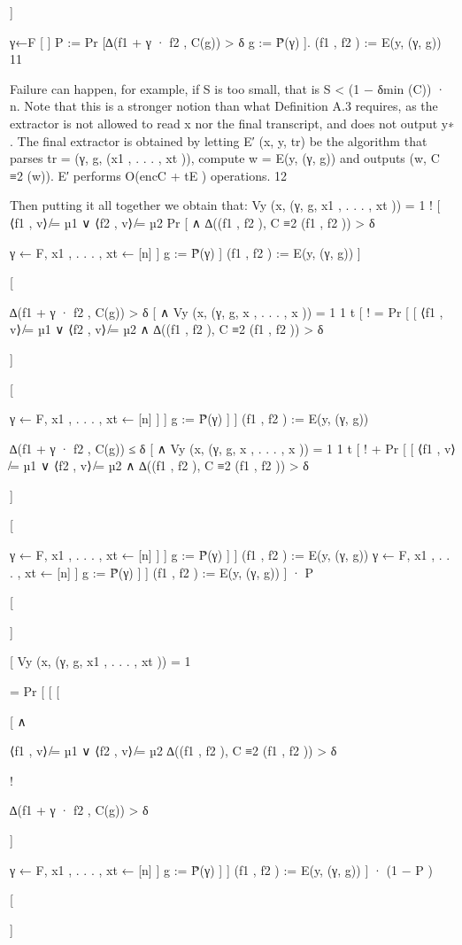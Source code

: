 \documentclass[11pt]{article}
\begin{document}
]

γ←F
[
]
P := Pr [∆(f1 + γ · f2 , C(g)) > δ g := P̃(γ)
].
(f1 , f2 ) := E(y, (γ, g))
11

Failure can happen, for example, if S is too small, that is S < (1 − δmin (C)) · n.
Note that this is a stronger notion than what Definition A.3 requires, as the extractor is not allowed to read x nor
the final transcript, and does not output y∗ . The final extractor is obtained by letting E′ (x, y, tr) be the algorithm
that parses tr = (γ, g, (x1 , . . . , xt )), compute w = E(y, (γ, g)) and outputs (w, C ≡2 (w)). E′ performs O(encC + tE )
operations.
12

Then putting it all together we obtain that:
Vy (x, (γ, g, x1 , . . . , xt )) = 1
!
[
⟨f1 , v⟩ ̸= µ1 ∨ ⟨f2 , v⟩ ̸= µ2
Pr [
∧
∆((f1 , f2 ), C ≡2 (f1 , f2 )) > δ

γ ← F, x1 , . . . , xt ← [n]
]
g := P̃(γ)
]
(f1 , f2 ) := E(y, (γ, g))
]

[

∆(f1 + γ · f2 , C(g)) > δ
[ ∧ Vy (x, (γ, g, x , . . . , x )) = 1
1
t
[
!
= Pr [
[
⟨f1 , v⟩ ̸= µ1 ∨ ⟨f2 , v⟩ ̸= µ2
∧
∆((f1 , f2 ), C ≡2 (f1 , f2 )) > δ

]

[

γ ← F, x1 , . . . , xt ← [n] ]
]
g := P̃(γ)
]
]
(f1 , f2 ) := E(y, (γ, g))

∆(f1 + γ · f2 , C(g)) ≤ δ
[ ∧ Vy (x, (γ, g, x , . . . , x )) = 1
1
t
[
!
+ Pr [
[
⟨f1 , v⟩ ̸= µ1 ∨ ⟨f2 , v⟩ ̸= µ2
∧
∆((f1 , f2 ), C ≡2 (f1 , f2 )) > δ

]

[

γ ← F, x1 , . . . , xt ← [n] ]
]
g := P̃(γ)
]
]
(f1 , f2 ) := E(y, (γ, g))
γ ← F, x1 , . . . , xt ← [n]
]
g := P̃(γ)
]
]
(f1 , f2 ) := E(y, (γ, g)) ] · P

[

]

[ Vy (x, (γ, g, x1 , . . . , xt )) = 1

= Pr [
[
[

[ ∧

⟨f1 , v⟩ ̸= µ1 ∨ ⟨f2 , v⟩ ̸= µ2
∆((f1 , f2 ), C ≡2 (f1 , f2 )) > δ

!

∆(f1 + γ · f2 , C(g)) > δ

]

γ ← F, x1 , . . . , xt ← [n]
]
g := P̃(γ)
]
]
(f1 , f2 ) := E(y, (γ, g)) ] · (1 − P )

[

]
\end{document}
